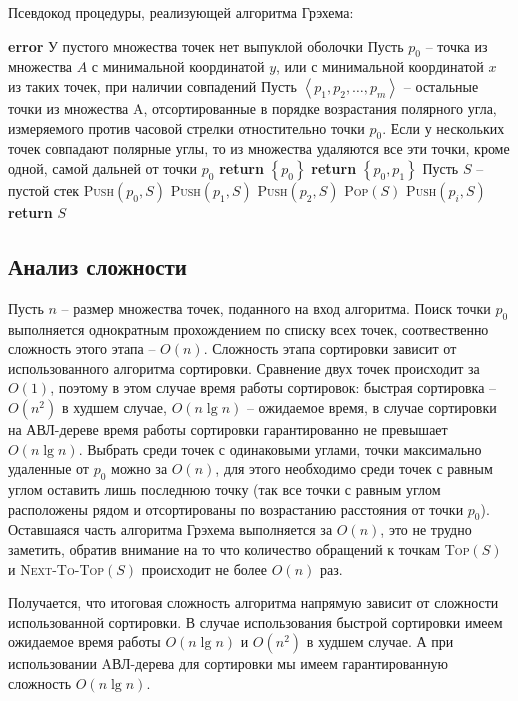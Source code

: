 \noindent Псевдокод процедуры, реализующей алгоритма Грэхема:
\begin{algorithmic}[1]
			\State \textbf{error} У пустого множества точек нет выпуклой оболочки
		\EndIf
		\State Пусть $p_0$ -- точка из множества $A$ с минимальной координатой $y$, или с минимальной координатой $x$ из таких точек, при наличии совпадений
		\State Пусть $\left\langle p_1, p_2, \dots, p_m\right\rangle $ -- остальные точки из множества A, отсортированные в порядке возрастания полярного угла, измеряемого против часовой стрелки отностительно точки $p_0$. Если у нескольких точек совпадают полярные углы, то из множества удаляются все эти точки, кроме одной, самой дальней от точки $p_0$
			\State \textbf{return} $\left\lbrace p_0\right\rbrace $
			\State \textbf{return} $\left\lbrace p_0, p_1\right\rbrace $
		\Else
			\State Пусть $S$ -- пустой стек
			\State \textsc{Push}$(p_0, S)$
			\State \textsc{Push}$(p_1, S)$
			\State \textsc{Push}$(p_2, S)$
					\State \textsc{Pop}$(S)$
				\EndWhile
				\State \textsc{Push}$(p_i, S)$
			\EndFor
			\State \textbf{return} $S$
		\EndIf
	\EndProcedure
\end{algorithmic}

\newpage

\subsection{Анализ сложности}

Пусть $n$ -- размер множества точек, поданного на вход алгоритма. Поиск точки $p_0$ выполняется однократным прохождением по списку всех точек, соотвественно сложность этого этапа -- $O(n)$. Сложность этапа сортировки зависит от использованного алгоритма сортировки. Сравнение двух точек происходит за $O(1)$, поэтому в этом случае время работы сортировок: быстрая сортировка -- $O(n^2)$ в худшем случае, $O(n\lg n)$ -- ожидаемое время, в случае сортировки на АВЛ-дереве время работы сортировки гарантированно не превышает $O(n\lg n)$. Выбрать среди точек с одинаковыми углами, точки максимально удаленные от $p_0$ можно за $O(n)$, для этого необходимо среди точек с равным углом оставить лишь последнюю точку (так все точки с равным углом расположены рядом и отсортированы по возрастанию расстояния от точки $p_0$). Оставшаяся часть алгоритма Грэхема выполняется за $O(n)$, это не трудно заметить, обратив внимание на то что количество обращений к точкам \textsc{Top}$(S)$ и \textsc{Next-To-Top}$(S)$ происходит не более $O(n)$ раз.

Получается, что итоговая сложность алгоритма напрямую зависит от сложности использованной сортировки. В случае использования быстрой сортировки имеем ожидаемое время работы $O(n\lg n)$ и $O(n^2)$ в худшем случае. А при использовании AВЛ-дерева для сортировки мы имеем гарантированную сложность $O(n\lg n)$.

\newpage
